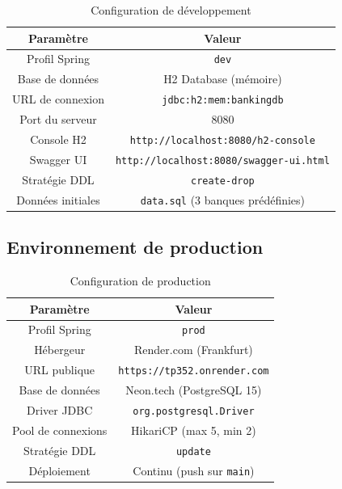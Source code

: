 \documentclass[12pt,a4paper]{article}
\newcommand{\tableheader}[1]{\textbf{#1}}
\begin{document}
\begin{table}[H]
    \centering
    \renewcommand{\arraystretch}{1.3}
    \begin{tabular}{|c|c|}
        \hline
        \tableheader{Paramètre} & \tableheader{Valeur} \\
        \hline
        Profil Spring & \texttt{dev} \\
        \hline
        Base de données & H2 Database (mémoire) \\
        \hline
        URL de connexion & \texttt{jdbc:h2:mem:bankingdb} \\
        \hline
        Port du serveur & 8080 \\
        \hline
        Console H2 & \texttt{http://localhost:8080/h2-console} \\
        \hline
        Swagger UI & \texttt{http://localhost:8080/swagger-ui.html} \\
        \hline
        Stratégie DDL & \texttt{create-drop} \\
        \hline
        Données initiales & \texttt{data.sql} (3 banques prédéfinies) \\
        \hline
    \end{tabular}
    \caption{Configuration de développement}
\end{table}

\subsection{Environnement de production}

\begin{table}[H]
    \centering
    \renewcommand{\arraystretch}{1.3}
    \begin{tabular}{|c|c|}
        \hline
        \tableheader{Paramètre} & \tableheader{Valeur} \\
        \hline
        Profil Spring & \texttt{prod} \\
        \hline
        Hébergeur & Render.com (Frankfurt) \\
        \hline
        URL publique & \texttt{https://tp352.onrender.com} \\
        \hline
        Base de données & Neon.tech (PostgreSQL 15) \\
        \hline
        Driver JDBC & \texttt{org.postgresql.Driver} \\
        \hline
        Pool de connexions & HikariCP (max 5, min 2) \\
        \hline
        Stratégie DDL & \texttt{update} \\
        \hline
        Déploiement & Continu (push sur \texttt{main}) \\
        \hline
    \end{tabular}
    \caption{Configuration de production}
\end{table}
\end{document}
